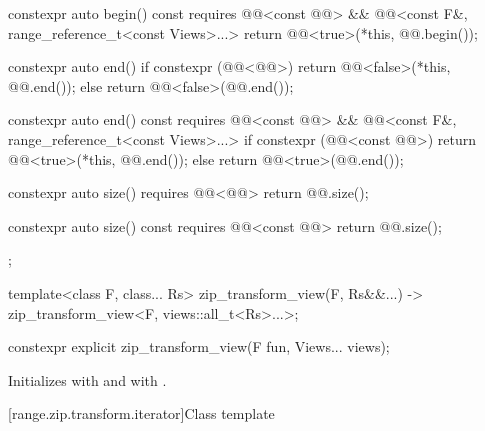 \begin{codeblock}
{{    constexpr auto begin() const
      requires @@<const @@> &&
               @@<const F&, range_reference_t<const Views>...> {
      return @@<true>(*this, @@.begin());
    }

    constexpr auto end() {
      if constexpr (@@<@@>) {
        return @@<false>(*this, @@.end());
      } else {
        return @@<false>(@@.end());
      }
    }

    constexpr auto end() const
      requires @@<const @@> &&
               @@<const F&, range_reference_t<const Views>...> {
      if constexpr (@@<const @@>) {
        return @@<true>(*this, @@.end());
      } else {
        return @@<true>(@@.end());
      }
    }

    constexpr auto size() requires @@<@@> {
      return @@.size();
    }

    constexpr auto size() const requires @@<const @@> {
      return @@.size();
    }
  };

  template<class F, class... Rs>
    zip_transform_view(F, Rs&&...) -> zip_transform_view<F, views::all_t<Rs>...>;
}
\end{codeblock}

%
\begin{itemdecl}
constexpr explicit zip_transform_view(F fun, Views... views);
\end{itemdecl}

\begin{itemdescr}
\pnum
\effects
Initializes  with  and
 with .
\end{itemdescr}

[range.zip.transform.iterator]{Class template }


